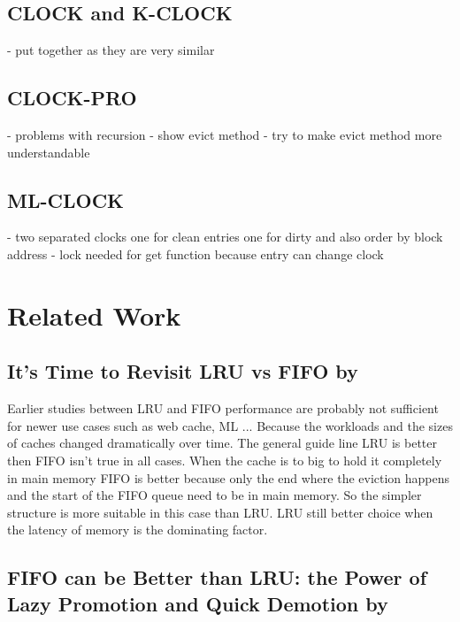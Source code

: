 \documentclass[
	12pt,
	a4paper,
	abstract,
	bibliography=totoc,
	chapterprefix,
	headings=openright,
	numbers=endperiod,
	parskip=half,
	twoside,
]{scrreprt}
\begin{document}
\section{CLOCK and K-CLOCK}

- put together as they are very similar

\section{CLOCK-PRO}

- problems with recursion
- show evict method 
- try to make evict method more understandable

\section{ML-CLOCK}

- two separated clocks one for clean entries one for dirty and also order by block address 
- lock needed for get function because entry can change clock

\chapter{Related Work}
\label{cha:related work}

\section*{It's Time to Revisit LRU vs FIFO by \cite{eytan2020s}}

Earlier studies between LRU and FIFO performance are probably not sufficient for newer use cases such as web cache, ML ...
Because the workloads and the sizes of caches changed dramatically over time.
The general guide line LRU is better then FIFO isn't true in all cases.
When the cache is to big to hold it completely in main memory FIFO is better because only the end where the eviction happens and the start of the FIFO queue need to be in main memory. So the simpler structure is more suitable in this case than LRU.
LRU still better choice when the latency of memory is the dominating factor.

\section*{FIFO can be Better than LRU: the Power of Lazy Promotion and Quick Demotion by \cite{yang2023fifo}}
\end{document}

